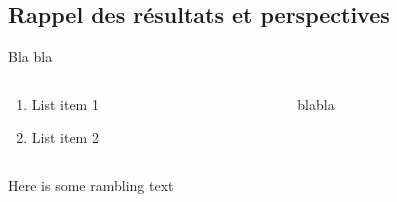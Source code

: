 \documentclass[xcolor=dvipsnames]{beamer}
\begin{document}
	\subsection*{Rappel des résultats et perspectives}

	\begin{frame}
		Bla bla 
		\begin{columns}
			\begin{column}{0.5\textwidth} %
				\begin{enumerate}
					\item List item 1
					\item List item 2
				\end{enumerate}
			\end{column}
			\begin{column}{0.5\textwidth}
				blabla
			\end{column}
		\end{columns}
		\vspace{\baselineskip}
		Here is some rambling text
	\end{frame}
\end{document}
